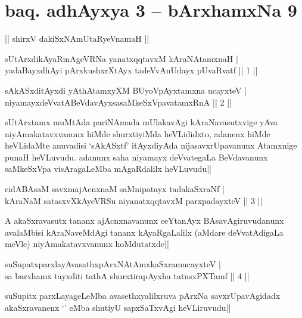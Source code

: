\section*{baq. adhAyxya 3 -- bArxhamxNa 9}

\begin{center}%
|| shirxV dakiSxNAmUtaRyeVnamaH ||
\end{center}

\begin{shl}
sUtArxdikAyaRmAgeVRNa yanatxqqtavxM kAraNAtamxnaH |\\
yadaBayxdhAyi pArxkushxrXtAyx tadeVvAnUdayx pUvaRvatf \hfill || 1 ||
\end{shl}

\begin{shl}
sAkASxditAyxdi yAthAtamxyXM BUyoV\s pAyxtamxna ucayxteV |\\
niyamayxdeVvatABeVdavAyxsasaMkeSxVpavatamxRnA \hfill || 2 ||
\end{shl}

\begin{artha}
sUtArxtamx muMtAda pariNAmada mUlakavAgi kAraNavasutxvige yAva niyAmakatavxvanunx hiMde shurxtiyiMda heVLididxto, adanenx hiMde heVLidaMte anuvadisi `sAkASxtf' itAyxdiyAda nijasavxrUpavanunx Atamxnige punaH heVLuvudu. adanunx saha niyamayx deVvategaLa BeVdavanunx saMkeSxVpa visAragaLeMba mAgaRdalilx heVLuvudu||
\end{artha}


\begin{shl}
cidABAsaM savxmajAcnxnaM saMnipatayx tadakaSxraNf |\\
kAraNaM satasxvXkAyeVRSu niyanatxqqtavxM parxpadayxteV \hfill || 3 ||
\end{shl}

\begin{artha}
A akaSxravasutx tananx ajAcnxnavanunx ceYtanAyx BAsavAgiruvudanunx avalaMbisi kAraNaveMdAgi tananx kAyaRgaLalilx (aMdare deVvatAdigaLa meVle) niyAmakatavxvanunx hoMdutatxde||
\end{artha}

\begin{shl}
suSupatxparxlayAvasathxpArxNAtAmx\s kaSxramucayxteV |\\
sa barxhamx tayxditi tathA shurxtirapAyxha tatusxPXTamf \hfill || 4 ||
\end{shl}

\begin{artha}
suSupitx parxLayageLeMba avasethxyalilxruva pArxNa savxrUpavAgidadx akaSxravanenx `\stext ' eMba shutiyU sapxSaTxvAgi heVLiruvudu||
\end{artha}%

